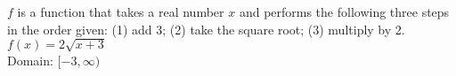 {$f$ is a function that takes a real number $x$ and performs the following three steps in the order given: (1) add 3; (2) take the square root; (3) multiply by 2.
}
{$f(x) = 2\sqrt{x+3}$ \\ Domain:  $[-3, \infty)$}